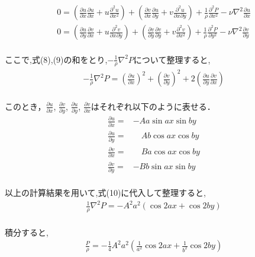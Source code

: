 \documentclass[12pt,a4paper]{jsarticle}
\begin{document}
\begin{eqnarray}
    0 =
    \left(
    \frac{\partial u}{\partial x}
    \frac{\partial u}{\partial x}+
    u\frac{\partial^2 u}{\partial x^2}
    \right) +
    \left(
    \frac{\partial v}{\partial x}
    \frac{\partial u}{\partial y}+
    v\frac{\partial^2 u}{\partial x \partial y}
    \right) +
    \frac{1}{\rho}\frac{\partial^2 P}{\partial x^2}
    -\nu\nabla^2\frac{\partial u}{\partial x}
    \\
    0 =
    \left(
    \frac{\partial u}{\partial y}
    \frac{\partial v}{\partial x}+
    u\frac{\partial^2 v}{\partial x \partial y}
    \right) +
    \left(
    \frac{\partial v}{\partial y}
    \frac{\partial v}{\partial y}+
    v\frac{\partial^2 v}{\partial x^2}
    \right) +
    \frac{1}{\rho}\frac{\partial^2 P}{\partial y^2}
    -\nu\nabla^2\frac{\partial v}{\partial y}
\end{eqnarray}\\
ここで,式(8),(9)の和をとり,$-\frac{1}{\rho} \nabla^2P$について整理すると,
\begin{eqnarray}
    -\frac{1}{\rho} \nabla^2P
    =
    \left( \frac{\partial u}{\partial x}\right)^2
    +
    \left( \frac{\partial v}{\partial y}\right)^2
    +
    2\left(
    \frac{\partial u}{\partial y}
    \frac{\partial v}{\partial x}
    \right)
\end{eqnarray}\\
このとき，$\frac{\partial u}{\partial x}$,
$\frac{\partial v}{\partial y}$,
$\frac{\partial u}{\partial y}$,
$\frac{\partial v}{\partial x}$はそれぞれ以下のように表せる．
\begin{eqnarray}
    \frac{\partial u}{\partial x}
    =&
    -Aa \sin{ax} \sin{by}
    \\
    \frac{\partial u}{\partial y}
    =&
    \quad Ab \cos{ax} \cos{by}
    \\
    \frac{\partial v}{\partial x}
    =&
    \quad Ba \cos{ax} \cos{by}
    \\
    \frac{\partial v}{\partial y}
    =&
    -Bb \sin{ax} \sin{by}
\end{eqnarray}\\
以上の計算結果を用いて,式(10)に代入して整理すると,
\begin{eqnarray}
    \frac{1}{\rho} \nabla^2P
    =
    -A^2a^2
    \left(
    \cos{2ax}
    +
    \cos {2by}
    \right)
\end{eqnarray}\\
積分すると,
\begin{eqnarray}
    \frac{P}{\rho}
    =
    -\frac{1}{4}A^2a^2
    \left(
    \frac{1}{a^2} \cos{2ax}
    +
    \frac{1}{b^2} \cos{2by}
    \right)
\end{eqnarray}\\
\end{document}
